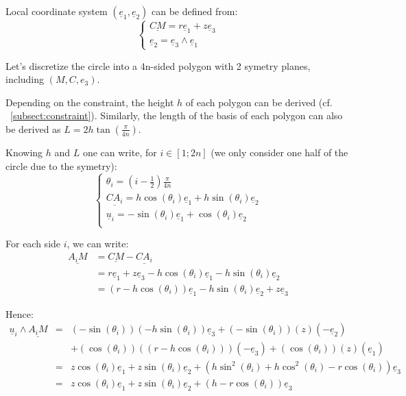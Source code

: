 \documentclass[a4paper,11pt,twoside,titlepage,openright]{book}
\numberwithin{equation}{section}
\newcommand{\ud}[1]{\underline{#1}}
\begin{document}
Local coordinate system $(\ud{e}_1, \ud{e}_2)$ can be defined from:
$$
\left\{
    \begin{array}{ll}
        \ud{CM} = r\ud{e}_1 + z\ud{e}_3\\
        \ud{e}_2 = \ud{e}_3 \wedge \ud{e}_1
	\end{array}
\right.
$$

Let's discretize the circle into a 4n-sided polygon with 2 symetry planes,
including $(M, C, {e}_3)$.

Depending on the constraint, the height $h$ of each polygon can be derived (cf.
~\ref{subsect:constraint}). Similarly, the length of the basis of each polygon
can also be derived as $L=2h\tan(\frac{\pi}{4n})$.

Knowing $h$ and $L$ one can write, for $i \in [1; 2n]$ (we only consider one
half of the circle due to the symetry):
$$
\left\{
    \begin{array}{ll}
        \theta_i = (i-\frac{1}{2})\frac{\pi}{4n}\\
        \ud{CA_i} = h\cos(\theta_i)\ud{e}_1 + h\sin(\theta_i)\ud{e}_2\\
        \ud{u}_i = -\sin(\theta_i)\ud{e}_1 + \cos(\theta_i)\ud{e}_2\\
	\end{array}
\right.
$$

For each side $i$, we can write:
$$
\begin{array}{ll}
    \ud{A_iM}
    & = \ud{CM} - \ud{CA_i}\\
    & = r\ud{e}_1 + z\ud{e}_3
    - h\cos(\theta_i)\ud{e}_1 - h\sin(\theta_i)\ud{e}_2\\
    & = (r-h\cos(\theta_i))\ud{e}_1 - h\sin(\theta_i)\ud{e}_2 + z\ud{e}_3
\end{array}
$$

Hence:
$$
\begin{array}{lll}
    \ud{u}_i \wedge \ud{A_iM}
    & = & (-\sin(\theta_i))(- h\sin(\theta_i))\ud{e}_3
    + (-\sin(\theta_i))(z)(-\ud{e}_2)\\
    && + (\cos(\theta_i))((r-h\cos(\theta_i)))(-\ud{e}_3)
    + (\cos(\theta_i))(z)(\ud{e}_1)\\
    & = & z\cos(\theta_i)\ud{e}_1
    + z\sin(\theta_i)\ud{e}_2
    + (h\sin^2(\theta_i) + h\cos^2(\theta_i) - r\cos(\theta_i))\ud{e}_3\\
    & = & z\cos(\theta_i)\ud{e}_1
    + z\sin(\theta_i)\ud{e}_2
    + (h - r\cos(\theta_i))\ud{e}_3\\
\end{array}
$$
\end{document}
